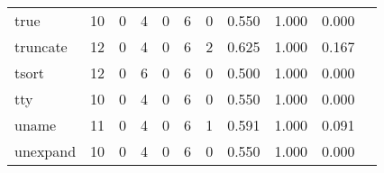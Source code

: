 \begin{longtable}{lp{1.20cm}p{1.20cm}p{1.20cm}p{1.20cm}p{1.20cm}p{1.20cm}p{1.20cm}p{1.20cm}p{1.20cm}p{1.20cm}}
true      &                                    10 &                                                  0 &                                                  4 &                                                  0 &                                                  6 &                                                  0 &                                         0.550 &                                              1.000 &                                              0.000 \\
truncate  &                                    12 &                                                  0 &                                                  4 &                                                  0 &                                                  6 &                                                  2 &                                         0.625 &                                              1.000 &                                              0.167 \\
tsort     &                                    12 &                                                  0 &                                                  6 &                                                  0 &                                                  6 &                                                  0 &                                         0.500 &                                              1.000 &                                              0.000 \\
tty       &                                    10 &                                                  0 &                                                  4 &                                                  0 &                                                  6 &                                                  0 &                                         0.550 &                                              1.000 &                                              0.000 \\
uname     &                                    11 &                                                  0 &                                                  4 &                                                  0 &                                                  6 &                                                  1 &                                         0.591 &                                              1.000 &                                              0.091 \\
unexpand  &                                    10 &                                                  0 &                                                  4 &                                                  0 &                                                  6 &                                                  0 &                                         0.550 &                                              1.000 &                                              0.000 \\

\end{longtable}
